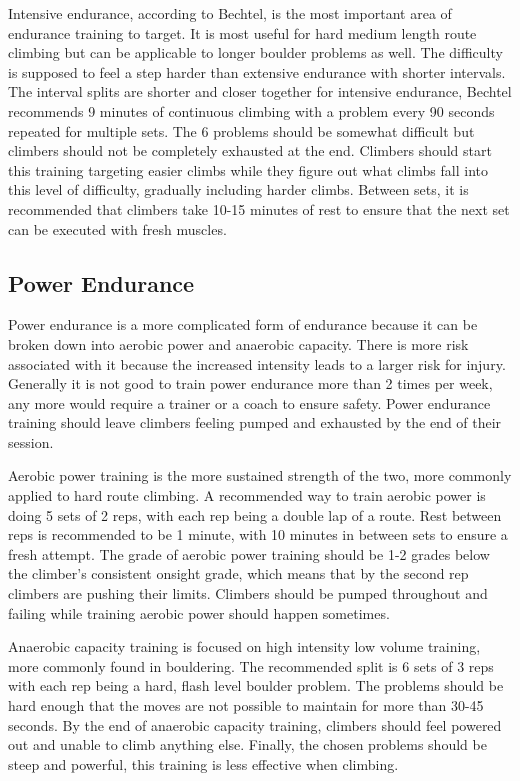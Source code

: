 \documentclass[10pt,twocolumn]{article}
\begin{document}
	Intensive endurance, according to Bechtel, is the most important area of endurance training to target. It is most useful for hard medium length route climbing but can be applicable to longer boulder problems as well. The difficulty is supposed to feel a step harder than extensive endurance with shorter intervals. The interval splits are shorter and closer together for intensive endurance, Bechtel recommends 9 minutes of continuous climbing with a problem every 90 seconds repeated for multiple sets. The 6 problems should be somewhat difficult but climbers should not be completely exhausted at the end. Climbers should start this training targeting easier climbs while they figure out what climbs fall into this level of difficulty, gradually including harder climbs. Between sets, it is recommended that climbers take 10-15 minutes of rest to ensure that the next set can be executed with fresh muscles. \cite{bechtel_endurance_2017} 

\subsection{Power Endurance}

	Power endurance is a more complicated form of endurance because it can be broken down into aerobic power and anaerobic capacity. There is more risk associated with it because the increased intensity leads to a larger risk for injury. Generally it is not good to train power endurance more than 2 times per week, any more would require a trainer or a coach to ensure safety. Power endurance training should leave climbers feeling pumped and exhausted by the end of their session.

	Aerobic power training is the more sustained strength of the two, more commonly applied to hard route climbing. A recommended way to train aerobic power is doing 5 sets of 2 reps, with each rep being a double lap of a route. Rest between reps is recommended to be 1 minute, with 10 minutes in between sets to ensure a fresh attempt. The grade of aerobic power training should be 1-2 grades below the climber's consistent onsight grade, which means that by the second rep climbers are pushing their limits. Climbers should be pumped throughout and failing while training aerobic power should happen sometimes. \cite{randall_training_2019} 

	Anaerobic capacity training is focused on high intensity low volume training, more commonly found in bouldering. The recommended split is 6 sets of 3 reps with each rep being a hard, flash level boulder problem. The problems should be hard enough that the moves are not possible to maintain for more than 30-45 seconds. By the end of anaerobic capacity training, climbers should feel powered out and unable to climb anything else. Finally, the chosen problems should be steep and powerful, this training is less effective when climbing. \cite{randall_training_2019}
	
\end{document}
